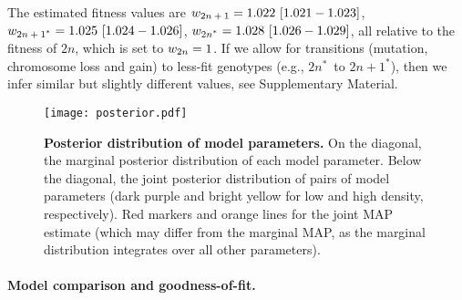 \documentclass[12pt]{article}
\newcommand{\euwt}{\emph{$2n$}}
\newcommand{\anwt}{\emph{$2n+1$}}
\newcommand{\eumt}{\emph{$2n^*$}}
\newcommand{\anmt}{\emph{$2n+1^*$}}
\begin{document}
The estimated fitness values are $w_{\anwt}=1.022\ [1.021-1.023]$,
$w_{\anmt}=1.025\ [1.024-1.026]$,
$w_{\eumt}=1.028\ [1.026-1.029]$, all relative to the fitness of \euwt, which is set to $w_{\euwt}=1$. 
If we allow for transitions (mutation, chromosome loss and gain) to less-fit genotypes (e.g., \eumt\ to \anmt), then we infer similar but slightly different values, see Supplementary Material.

\begin{figure}[h]
  \centering
\texttt{[image: posterior.pdf]}
  \caption{
  \textbf{Posterior distribution of model parameters.}
On the diagonal, the marginal posterior distribution of each model parameter. 
Below the diagonal, the joint posterior distribution of pairs of model parameters (dark purple and bright yellow for low and high density, respectively). Red markers and orange lines for the joint MAP estimate (which may differ from the marginal MAP, as the marginal distribution integrates over all other parameters).
} 
  \label{fig:posterior}
\end{figure}

\paragraph{Model comparison and goodness-of-fit.}
\end{document}
